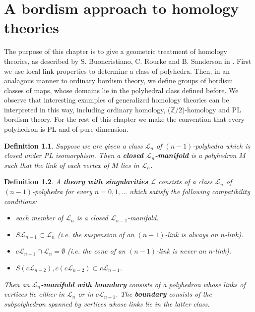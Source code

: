 \documentclass[11pt]{book}
\newtheorem{definition}{Definition}
\begin{document}
\chapter{A bordism approach to homology theories}
The purpose of this chapter is to give a geometric treatment of homology theories, as described by S. Buoncristiano, C. Rourke and B. Sanderson in \cite{BRS}. First we use local link properties to determine a class of polyhedra. Then, in an analagous manner to ordinary bordism theory, we define groups of bordism classes of maps, whose domains lie in the polyhedral class defined before. We observe that interesting examples of generalized homology theories can be interpreted in this way, including ordinary homology, ($\mathbb{Z}/2$)-homology and PL bordism theory. \newline
For the rest of this chapter we make the convention that every polyhedron is PL and of pure dimension.

\begin{definition}
Suppose we are given a class $\mathcal{L}_n$ of $(n-1)$-polyhedra which is closed under PL isomorphism. Then a \textbf{closed $\mathcal{L}_n$-manifold} is a polyhedron $M$ such that the link of each vertex of $M$ lies in $\mathcal{L}_n$. 
\end{definition}

\begin{definition}\label{theory}
A \textbf{theory with singularities} $\mathcal{L}$ consists of a class $\mathcal{L}_n$ of $(n-1)$-polyhedra for every $n=0,1,...$ which satisfy the following compatibility conditions:
\begin{itemize}
\item[1.] each member of $\mathcal{L}_n$ is a closed $\mathcal{L}_{n-1}$-manifold.
\item[2.] $S \mathcal{L}_{n-1} \subset \mathcal{L}_n$ (i.e. the suspension of an $(n-1)$-link is always an $n$-link).
\item[3.] $c \mathcal{L}_{n-1} \cap \mathcal{L}_n = \emptyset$ (i.e. the cone of an $(n-1)$-link is never an $n$-link).
\item[4.] $S(c\mathcal{L}_{n-2}), c(c \mathcal{L}_{n-2}) \subset c \mathcal{L}_{n-1}$.
\end{itemize}
Then an \textbf{$\mathcal{L}_n$-manifold with boundary} consists of a polyhedron whose links of vertices lie either in $\mathcal{L}_n$ or in $c \mathcal{L}_{n-1}$. The \textbf{boundary} consists of the subpolyhedron spanned by vertices whose links lie in the latter class.
\end{definition}
\end{document}
